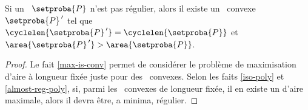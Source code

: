

\begin{fact} \label{nece-cond}
	Si un \ngone\ $\setproba{P}$ n'est pas régulier,
	alors il existe un \ngone\ convexe $\setproba{P}^{\,\prime}$ tel que
	$\cyclelen{\setproba{P}^{\,\prime}} = \cyclelen{\setproba{P}}$
	et
	$\area{\setproba{P}^{\,\prime}} > \area{\setproba{P}}$.
\end{fact}


\begin{proof}
	Le fait \ref{max-is-conv} permet de considérer le problème de maximisation d'aire à longueur fixée juste pour des \ngones\ convexes.
	Selon les faits \ref{iso-poly} et \ref{almost-reg-poly}, si, parmi les \ngones\ convexes de longueur fixée, il en existe un d'aire maximale, alors il devra être, a minima, régulier.
\end{proof}
